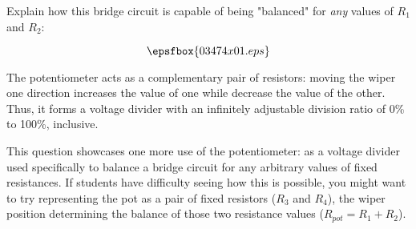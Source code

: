 

Explain how this bridge circuit is capable of being "balanced" for {\it any} values of $R_1$ and $R_2$:

$$\epsfbox{03474x01.eps}$$







The potentiometer acts as a complementary pair of resistors: moving the wiper one direction increases the value of one while decrease the value of the other.  Thus, it forms a voltage divider with an infinitely adjustable division ratio of 0\% to 100\%, inclusive.







This question showcases one more use of the potentiometer: as a voltage divider used specifically to balance a bridge circuit for any arbitrary values of fixed resistances.  If students have difficulty seeing how this is possible, you might want to try representing the pot as a pair of fixed resistors ($R_3$ and $R_4$), the wiper position determining the balance of those two resistance values ($R_{pot} = R_1 + R_2$).




